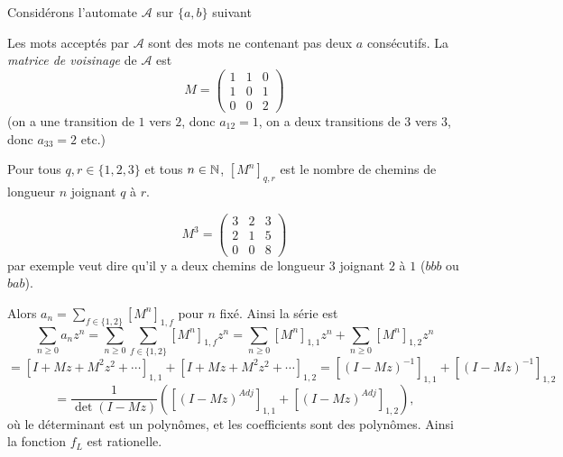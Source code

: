   \begin{preuve}
    Considérons l'automate $\mathcal{A}$ sur $\{a, b\}$ suivant

    \begin{center}
    \end{center}

    Les mots acceptés par $\mathcal{A}$ sont des mots ne contenant pas deux $a$ consécutifs. La \emph{matrice
      de voisinage}  de $\mathcal{A}$ est 
      \[
      M = 
      \begin{pmatrix}
        1 & 1 & 0 \\ 1 & 0 & 1 \\ 0 & 0 & 2
      \end{pmatrix}
      \]
    (on a une transition de $1$ vers $2$, donc $a_{12} = 1$, on a deux transitions de $3$ vers $3$, donc
    $a_{33} = 2$ etc.)

    Pour tous $q, r \in \{1, 2, 3\}$ et tous $n \in \mathbb{N}$, $[M^n]_{q,r}$ est le nombre de chemins de longueur
    $n$ joignant $q$ à $r$.

    \[
    M^3 = 
    \begin{pmatrix}
      3 & 2 & 3 \\ 2 & 1 & 5 \\ 0 & 0 & 8
    \end{pmatrix}
    \]
    par exemple veut dire qu'il y a deux chemins de longueur $3$ joignant $2$ à $1$ ($bbb$ ou $bab$).

    Alors $a_n = \sum_{f \in \{1, 2\}} [M^n]_{1, f}$ pour $n$ fixé. Ainsi la série est
      \[\sum_{n \geq 0}a_nz^n = \sum_{n \geq 0} \sum_{f \in \{1, 2\}}[M^n]_{1, f}z^n = \sum_{n \geq 0}
      [M^n]_{1,1}z^n + \sum_{n \geq 0} [M^n]_{1,2} z^n \]
      \[ = [I + Mz + M^2z^2 + \cdots]_{1,1} + [I + Mz + M^2z^2+\cdots]_{1,2} = [(I-Mz)^{-1}]_{1,1} +
      [(I-Mz)^{-1}]_{1,2}\]
      \[= \frac{1}{\det(I-Mz)} \left( \left[(I-Mz)^{Adj}\right]_{1,1} +
        \left[(I-Mz)^{Adj}\right]_{1,2}\right),\]
    où le déterminant est un polynômes, et les coefficients sont des polynômes. Ainsi la fonction $f_L$ est rationelle.
  \end{preuve}

